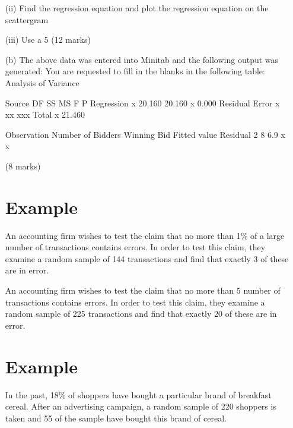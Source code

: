 \documentclass[]{report}
\begin{document}
\begin{enumerate}[(i)]
\begin{itemize}
	
	
	(a) You are required 
	(i)To draw a Scatter Gram and comment on its features
	\item[(ii)]Find the regression equation and plot the regression equation on the scattergram
	\item[(iii)]Use a 5%
	(12 marks)
	
	
	(b) The above data was entered into Minitab and the following output was generated:
	You are requested to fill in the blanks in the following table:
	Analysis of Variance
	
	Source      	      DF          SS          MS         F        P
	Regression      	        x         20.160      20.160   x         0.000
	Residual Error         x        xx              xxx
	Total             	        x         21.460
	
	
	Observation    Number of Bidders	Winning Bid	Fitted value	Residual
	2	8			        6.9 		      x			      x
	
	(8 marks)
	




\section{Example}

An accounting firm wishes to test the claim that no more than 1\% of a large
number of transactions contains errors. In order to test this claim, they
examine a random sample of 144 transactions and find that exactly 3 of
these are in error.

An accounting firm wishes to test the claim that no more than 5%
number of transactions contains errors. In order to test this claim, they examine a
random sample of 225 transactions and find that exactly 20 of these are in error.
\section{Example}

In the past, 18\% of shoppers have bought a particular brand of breakfast cereal.
After an advertising campaign, a random sample of 220 shoppers is taken and 55 of the sample have bought this brand of cereal.


\end{itemize}
\end{enumerate}
\end{document}
